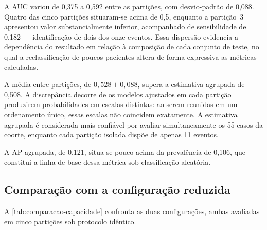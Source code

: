 A \gls{AUC} variou de 0,375 a 0,592 entre as partições, com desvio-padrão de
0,088. Quatro das cinco partições situaram-se acima de 0,5, enquanto a
partição~3 apresentou valor substancialmente inferior, acompanhado de
sensibilidade de 0,182 --- identificação de dois dos onze eventos. Essa
dispersão evidencia a dependência do resultado em relação à composição de
cada conjunto de teste, no qual a reclassificação de poucos pacientes altera
de forma expressiva as métricas calculadas.

A média entre partições, de $0{,}528 \pm 0{,}088$, supera a estimativa
agrupada de 0,508. A discrepância decorre de os modelos ajustados em cada
partição produzirem probabilidades em escalas distintas: ao serem reunidas em
um ordenamento único, essas escalas não coincidem exatamente. A estimativa
agrupada é considerada mais confiável por avaliar simultaneamente os 55 casos
da coorte, enquanto cada partição isolada dispõe de apenas 11 eventos.

A \gls{AP} agrupada, de 0,121, situa-se pouco acima da prevalência de 0,106,
que constitui a linha de base dessa métrica sob classificação aleatória.

\subsection{Comparação com a configuração reduzida}
\label{subsec:comparacao-capacidade}

A \autoref{tab:comparacao-capacidade} confronta as duas configurações, ambas
avaliadas em cinco partições sob protocolo idêntico.

\begin{table}[h!]
	\captionsetup{width=14.5cm}
\end{table}

